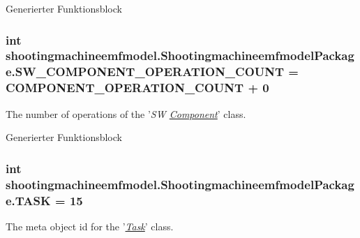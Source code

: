 Generierter Funktionsblock  \hypertarget{interfaceshootingmachineemfmodel_1_1_shootingmachineemfmodel_package_a9aa427e39341f11b62684dd213391b4b}{
\subsubsection[{S\-W\-\_\-\-C\-O\-M\-P\-O\-N\-E\-N\-T\-\_\-\-O\-P\-E\-R\-A\-T\-I\-O\-N\-\_\-\-C\-O\-U\-N\-T}]{\setlength{\rightskip}{0pt plus 5cm}int shootingmachineemfmodel.\-Shootingmachineemfmodel\-Package.\-S\-W\-\_\-\-C\-O\-M\-P\-O\-N\-E\-N\-T\-\_\-\-O\-P\-E\-R\-A\-T\-I\-O\-N\-\_\-\-C\-O\-U\-N\-T = {\bf C\-O\-M\-P\-O\-N\-E\-N\-T\-\_\-\-O\-P\-E\-R\-A\-T\-I\-O\-N\-\_\-\-C\-O\-U\-N\-T} + 0}}\label{interfaceshootingmachineemfmodel_1_1_shootingmachineemfmodel_package_a9aa427e39341f11b62684dd213391b4b}
The number of operations of the '{\itshape S\-W \hyperlink{interfaceshootingmachineemfmodel_1_1_component}{Component}}' class.

Generierter Funktionsblock  \hypertarget{interfaceshootingmachineemfmodel_1_1_shootingmachineemfmodel_package_a11c1e4cd4815521f642d021ef075f350}{
\subsubsection[{T\-A\-S\-K}]{\setlength{\rightskip}{0pt plus 5cm}int shootingmachineemfmodel.\-Shootingmachineemfmodel\-Package.\-T\-A\-S\-K = 15}}\label{interfaceshootingmachineemfmodel_1_1_shootingmachineemfmodel_package_a11c1e4cd4815521f642d021ef075f350}
The meta object id for the '\hyperlink{classshootingmachineemfmodel_1_1impl_1_1_task_impl}{{\itshape Task}}' class.

